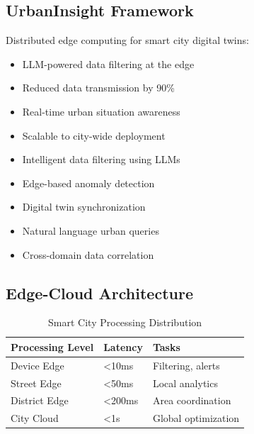 \documentclass[12pt,a4paper]{article}
\begin{document}
\subsection{UrbanInsight Framework}

Distributed edge computing for smart city digital twins:
\begin{itemize}
    \item LLM-powered data filtering at the edge
    \item Reduced data transmission by 90\%
    \item Real-time urban situation awareness
    \item Scalable to city-wide deployment
\end{itemize}

\begin{tcolorbox}[colback=cityblue!10, colframe=cityblue, title=UrbanInsight Capabilities]
\begin{itemize}
    \item Intelligent data filtering using LLMs
    \item Edge-based anomaly detection
    \item Digital twin synchronization
    \item Natural language urban queries
    \item Cross-domain data correlation
\end{itemize}
\end{tcolorbox}

\subsection{Edge-Cloud Architecture}

\begin{table}[H]
\centering
\caption{Smart City Processing Distribution}
\begin{tabular}{lll}
\toprule
\textbf{Processing Level} & \textbf{Latency} & \textbf{Tasks} \\
\midrule
Device Edge & <10ms & Filtering, alerts \\
Street Edge & <50ms & Local analytics \\
District Edge & <200ms & Area coordination \\
City Cloud & <1s & Global optimization \\
\bottomrule
\end{tabular}
\end{table}

\end{document}
